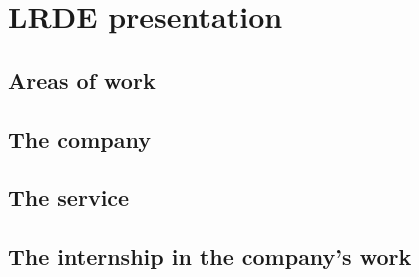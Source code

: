 \chapter{LRDE presentation}
\section{Areas of work}
\section{The company}
\section{The service}
\section{The internship in the company's work}